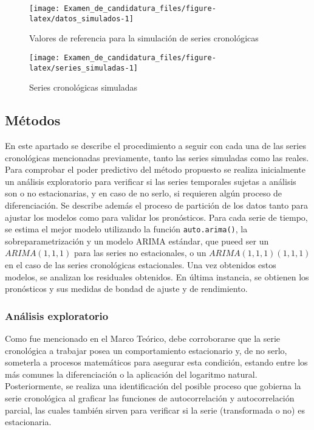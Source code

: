 \documentclass[
]{article}
\begin{document}
\begin{figure}[H]
\texttt{[image: Examen\_de\_candidatura\_files/figure-latex/datos\_simulados-1]} \caption{Valores de referencia para la simulación de series cronológicas}\label{fig:datos_simulados}
\end{figure}

\begin{figure}[H]
\texttt{[image: Examen\_de\_candidatura\_files/figure-latex/series\_simuladas-1]} \caption{Series cronológicas simuladas}\label{fig:series_simuladas}
\end{figure}

\subsection{Métodos}

En este apartado se describe el procedimiento a seguir con cada una de
las series cronológicas mencionadas previamente, tanto las series
simuladas como las reales. Para comprobar el poder predictivo del método
propuesto se realiza inicialmente un análisis exploratorio para
verificar si las series temporales sujetas a análisis son o no
estacionarias, y en caso de no serlo, si requieren algún proceso de
diferenciación. Se describe además el proceso de partición de los datos
tanto para ajustar los modelos como para validar los pronósticos. Para
cada serie de tiempo, se estima el mejor modelo utilizando la función
\texttt{auto.arima()}, la sobreparametrización y un modelo ARIMA
estándar, que pueed ser un \(ARIMA(1,1,1)\) para las series no
estacionales, o un \(ARIMA(1,1,1)(1,1,1)\) en el caso de las series
cronológicas estacionales. Una vez obtenidos estos modelos, se analizan
los residuales obtenidos. En última instancia, se obtienen los
pronósticos y sus medidas de bondad de ajuste y de rendimiento.

\subsubsection{Análisis exploratorio}

Como fue mencionado en el Marco Teórico, debe corroborarse que la serie
cronológica a trabajar posea un comportamiento estacionario y, de no
serlo, someterla a procesos matemáticos para asegurar esta condición,
estando entre los más comunes la diferenciación o la aplicación del
logaritmo natural. Posteriormente, se realiza una identificación del
posible proceso que gobierna la serie cronológica al graficar las
funciones de autocorrelación y autocorrelación parcial, las cuales
también sirven para verificar si la serie (transformada o no) es
estacionaria.
\end{document}
